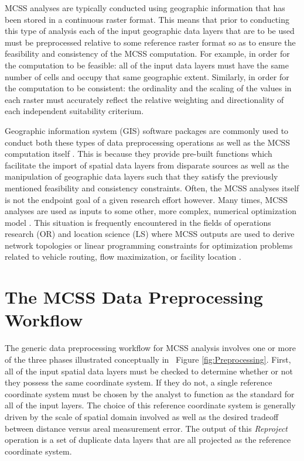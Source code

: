 MCSS analyses are typically conducted using geographic information that has been stored in a continuous raster format. This means that prior to conducting this type of analysis each of the input geographic data layers that are to be used must be preprocessed relative to some reference raster format so as to ensure the feasibility and consistency of the MCSS computation. For example, in order for the computation to be feasible: all of the input data layers must have the same number of cells and occupy that same geographic extent. Similarly, in order for the computation to be consistent: the ordinality and the scaling of the values in each raster must accurately reflect the relative weighting and directionality of each independent suitability criterium.
 
Geographic information system (GIS) software packages are commonly used to conduct both these types of data preprocessing operations as well as the MCSS computation itself \cite{Malczewski2004, Malczewski2006}. This is because they provide pre-built functions which facilitate the import of spatial data layers from disparate sources as well as the manipulation of geographic data layers such that they satisfy the previously mentioned feasibility and consistency constraints. Often, the MCSS analyses itself is not the endpoint goal of a given research effort however. Many times, MCSS analyses are used as inputs to some other, more complex, numerical optimization model \cite{Church2002}. This situation is frequently encountered in the fields of operations research (OR) and location science (LS) where MCSS outputs are used to derive network topologies or linear programming constraints for optimization problems related to vehicle routing, flow maximization, or facility location \cite{Huber1985, Church1992}. 

\section{The MCSS Data Preprocessing Workflow}
    
The generic data preprocessing workflow for MCSS analysis involves one or more of the three phases illustrated conceptually in ~Figure \ref{fig:Preprocessing}. First, all of the input spatial data layers must be checked to determine whether or not they possess the same coordinate system. If they do not, a single reference coordinate system must be chosen by the analyst to function as the standard for all of the input layers. The choice of this reference coordinate system is generally driven by the scale of spatial domain involved as well as the desired tradeoff between distance versus areal measurement error. The output of this \textit{Reproject} operation is a set of duplicate  data layers that are all projected as the reference coordinate system. 

